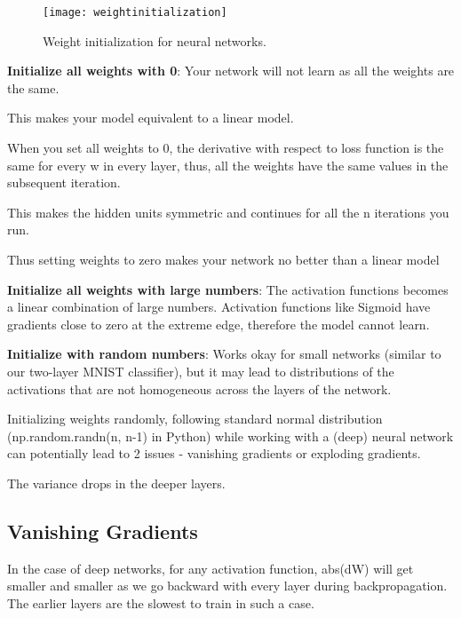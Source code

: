 	\begin{figure}[htb]
		\centering
		\texttt{[image: weightinitialization]}
		\caption[Weight initialization for neural networks]{Weight initialization for neural networks.}
		\label{fig:weightinitialization}
	\end{figure}

	\begin{bulletedlist}
		\item {\bfseries Initialize all weights with 0}:  Your network will not learn as all the weights are the same.
		\begin{bulletedlist}
			\item This makes your model equivalent to a linear model.
			\item When you set all weights to 0, the derivative with respect to loss function is the same for every w in every layer, thus, all the weights have the same values in the subsequent iteration.
			\item This makes the hidden units symmetric and continues for all the n iterations you run.
			\item Thus setting weights to zero makes your network no better than a linear model
		\end{bulletedlist}
		\item {\bfseries Initialize all weights with large numbers}:  The activation functions becomes a linear combination of large numbers.  Activation functions like Sigmoid have gradients close to zero at the extreme edge, therefore the model cannot learn.
		\item {\bfseries Initialize with random numbers}: Works okay for small networks (similar to our two-layer MNIST classifier), but it may lead to distributions of the activations that are not homogeneous across the layers of the network.
		\begin{bulletedlist}
			\item Initializing weights randomly, following standard normal distribution \newline{}(np.random.randn(n, n-1) in Python) while working with a (deep) neural network can potentially lead to 2 issues - vanishing gradients or exploding gradients.
			\item The variance drops in the deeper layers.
		\end{bulletedlist}
	\end{bulletedlist}

	\subsection{Vanishing Gradients}
In the case of deep networks, for any activation function, abs(dW) will get smaller and smaller as we go backward with every layer during backpropagation.  The earlier layers are the
slowest to train in such a case.

